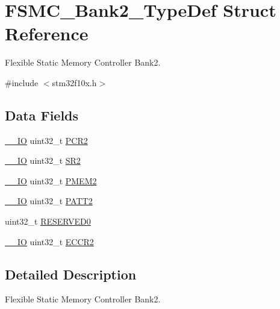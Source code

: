 \hypertarget{struct_f_s_m_c___bank2___type_def}{}\section{F\+S\+M\+C\+\_\+\+Bank2\+\_\+\+Type\+Def Struct Reference}
\label{struct_f_s_m_c___bank2___type_def}


Flexible Static Memory Controller Bank2.  




{\ttfamily \#include $<$stm32f10x.\+h$>$}

\subsection*{Data Fields}
\begin{DoxyCompactItemize}
\item 
\mbox{\hyperlink{core__sc300_8h_aec43007d9998a0a0e01faede4133d6be}{\+\_\+\+\_\+\+IO}} uint32\+\_\+t \mbox{\hyperlink{struct_f_s_m_c___bank2___type_def_ab0cb1d704ee64c62ad5be55522a2683a}{P\+C\+R2}}
\item 
\mbox{\hyperlink{core__sc300_8h_aec43007d9998a0a0e01faede4133d6be}{\+\_\+\+\_\+\+IO}} uint32\+\_\+t \mbox{\hyperlink{struct_f_s_m_c___bank2___type_def_a89623ee198737b29dc0a803310605a83}{S\+R2}}
\item 
\mbox{\hyperlink{core__sc300_8h_aec43007d9998a0a0e01faede4133d6be}{\+\_\+\+\_\+\+IO}} uint32\+\_\+t \mbox{\hyperlink{struct_f_s_m_c___bank2___type_def_a2e5a7a96de68a6612affa6df8c309c3d}{P\+M\+E\+M2}}
\item 
\mbox{\hyperlink{core__sc300_8h_aec43007d9998a0a0e01faede4133d6be}{\+\_\+\+\_\+\+IO}} uint32\+\_\+t \mbox{\hyperlink{struct_f_s_m_c___bank2___type_def_a9c1bc909ec5ed32df45444488ea6668b}{P\+A\+T\+T2}}
\item 
uint32\+\_\+t \mbox{\hyperlink{struct_f_s_m_c___bank2___type_def_af86c61a5d38a4fc9cef942a12744486b}{R\+E\+S\+E\+R\+V\+E\+D0}}
\item 
\mbox{\hyperlink{core__sc300_8h_aec43007d9998a0a0e01faede4133d6be}{\+\_\+\+\_\+\+IO}} uint32\+\_\+t \mbox{\hyperlink{struct_f_s_m_c___bank2___type_def_a05a47a1664adc7a3db3fa3e83fe883b4}{E\+C\+C\+R2}}
\end{DoxyCompactItemize}


\subsection{Detailed Description}
Flexible Static Memory Controller Bank2. 

